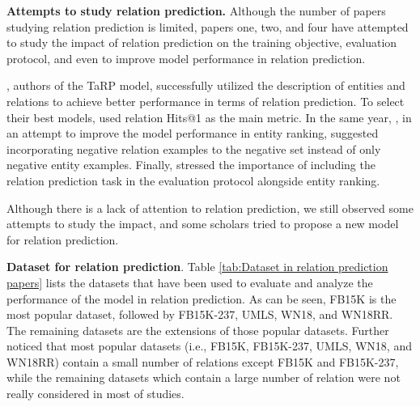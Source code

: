 \noindent\textbf{Attempts to study relation prediction.} Although the number of papers studying relation prediction is limited, papers one, two, and four have attempted to study the impact of relation prediction on the training objective, evaluation protocol, and even to improve model performance in relation prediction. 

\citet{cui2021type}, authors of the TaRP model, successfully utilized the description of entities and relations to achieve better performance in terms of relation prediction. To select their best models, \citet{cui2021type} used relation Hits@1 as the main metric. In the same year, \citet{chen2021relation}, in an attempt to improve the model performance in entity ranking, suggested incorporating negative relation examples to the negative set instead of only negative entity examples. Finally, \citet{chang2020benchmark} stressed the importance of including the relation prediction task in the evaluation protocol alongside entity ranking. 

Although there is a lack of attention to relation prediction, we still observed some attempts to study the impact, and some scholars tried to propose a new model for relation prediction. 
\newline

\noindent\textbf{Dataset for relation prediction}. Table \ref{tab:Dataset in relation prediction papers} lists the datasets that have been used to evaluate and analyze the performance of the model in relation prediction. As can be seen, FB15K is the most popular dataset, followed by FB15K-237, UMLS, WN18, and WN18RR. The remaining datasets are the extensions of those popular datasets. Further noticed that most popular datasets (i.e., FB15K, FB15K-237, UMLS, WN18, and WN18RR) contain a small number of relations except FB15K and FB15K-237, while the remaining datasets which contain a large number of relation were not really considered in most of studies. 
\newline

